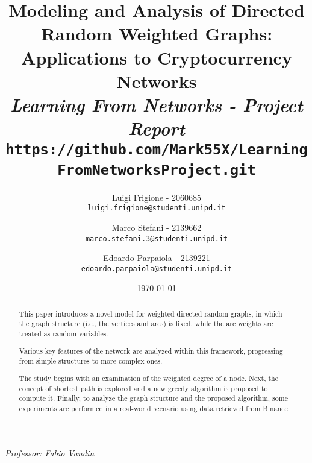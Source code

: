 \title{
	\vspace{-2cm}
    \textbf{Modeling and Analysis of Directed Random Weighted Graphs: Applications to Cryptocurrency Networks}\\[.4cm]
    
    {\large\emph{Learning From Networks - Project Report}}
    {\large\texttt{https://github.com/Mark55X/LearningFromNetworksProject.git}}
}

\author{
  Luigi Frigione - 2060685\\
  \texttt{\small{luigi.frigione@studenti.unipd.it}}
  \and
  Marco Stefani - 2139662\\
  \texttt{\small{marco.stefani.3@studenti.unipd.it}}
  \and
  Edoardo Parpaiola - 2139221\\
  \texttt{\small{edoardo.parpaiola@studenti.unipd.it}}
}

\date{\today}

\maketitle

\begin{abstract}
This paper introduces a novel model for weighted directed random graphs, in which the graph structure (i.e., the vertices and arcs) is fixed, while the arc weights are treated as random variables.

Various key features of the network are analyzed within this framework, progressing from simple structures to more complex ones.

The study begins with an examination of the weighted degree of a node\cite{gonzalez2010an}.
Next, the concept of shortest path is explored and a new greedy algorithm is proposed to compute it.
Finally, to analyze the graph structure and the proposed algorithm, some experiments are performed in a real-world scenario using data retrieved from Binance.
\end{abstract}

\vfill
{
    \emph{Professor: Fabio Vandin}
}

\newpage

\tableofcontents



